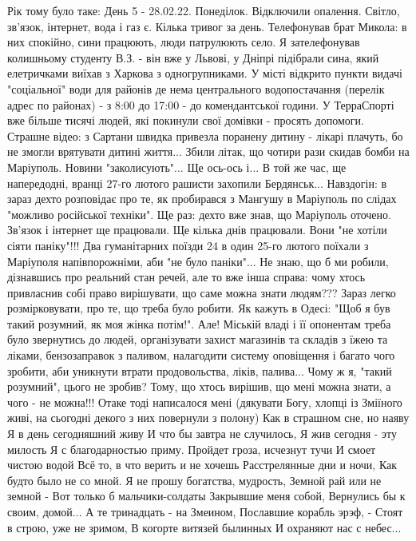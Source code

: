 Рік тому  було таке: 
День 5 - 28.02.22. Понеділок.
Відключили опалення. Світло, зв'язок, інтернет, вода і газ є. Кілька тривог за день.
Телефонував брат Микола: в них спокійно, сини працюють, люди патрулюють село.
Я зателефонував колишньому студенту В.З. - він вже у Львові, у Дніпрі підібрали сина, який елетричками виїхав з Харкова з одногрупниками. 
У місті відкрито пункти видачі "соціальної" води для районів де нема центрального водопостачання (перелік адрес по районах) - з 8:00  до 17:00 - до комендантської години.
У ТерраСпорті вже більше тисячі людей, які покинули свої домівки - просять допомоги.
Страшне відео: з Сартани швидка привезла поранену дитину - лікарі плачуть, бо не змогли врятувати дитині життя...
Збили літак, що чотири рази скидав бомби на Маріуполь.
Новини "заколисують"... Ще ось-ось і...
В той же час, ще напередодні, вранці 27-го лютого рашисти захопили Бердянськ...
Навздогін: в зараз дехто розповідає про те, як пробирався з Мангушу в Маріуполь по слідах "можливо російської техніки". 
Ще раз: дехто вже знав, що Маріуполь оточено. Зв'язок і інтернет ще працювали. Ще кілька днів працювали. Вони "не хотіли сіяти паніку"!!!
Два гуманітарних поїзди 24 в один 25-го лютого поїхали з Маріуполя напівпорожніми, аби "не було паніки"...
 Не знаю, що б ми робили, дізнавшись про реальний стан речей, але то вже інша справа: чому хтось привласнив собі право вирішувати, що саме можна знати людям??? Зараз легко розмірковувати, про те, що треба було робити. Як кажуть в Одесі: "Щоб я був такий розумний, як моя жінка потім!".
Але! Міській владі і її опонентам треба було звернутись до людей, організувати захист магазинів та складів з їжею та ліками, бензозаправок з паливом, налагодити систему оповіщення і багато чого зробити, аби уникнути втрати продовольства, ліків, палива... Чому ж я, "такий розумний", цього не зробив? Тому, що хтось вирішив, що мені можна знати, а чого - не можна!!!
Отаке тоді написалося мені 
(дякувати Богу,  хлопці із Зміїного живі, на сьогодні декого з них повернули з полону)
Как в страшном сне, но наяву
Я в день сегодняшний живу
И что бы завтра не случилось,
Я жив сегодня - эту милость
Я с благодарностью приму.
Пройдет гроза, исчезнут тучи
И смоет чистою водой
Всё то, в что верить и не хочешь
Расстрелянные дни и ночи,
Как будто было не со мной.
Я не прошу богатства, мудрость,
Земной рай или не земной -
Вот только б мальчики-солдаты
Закрывшие меня собой,
Вернулись бы к своим, домой...
А те тринадцать - на Змеином, 
Пославшие корабль эрэф, -
Стоят в строю, уже не зримом,
В когорте витязей былинных
И охраняют нас с небес...
